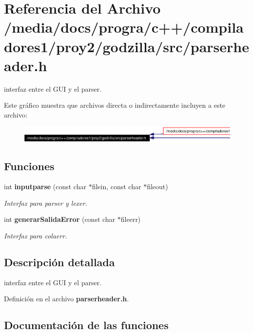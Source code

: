 \section{Referencia del Archivo /media/docs/progra/c++/compiladores1/proy2/godzilla/src/parserheader.h}
\label{parserheader_8h}
interfaz entre el GUI y el parser. 



Este gr\'{a}fico muestra que archivos directa o indirectamente incluyen a este archivo:\begin{figure}[H]
\begin{center}
\leavevmode
\includegraphics[width=420pt]{parserheader_8h__dep__incl}
\end{center}
\end{figure}
\subsection*{Funciones}
\begin{CompactItemize}
\item 
int {\bf inputparse} (const char $\ast$filein, const char $\ast$fileout)
\begin{CompactList}\small\item\em Interfaz para parser y lexer. \item\end{CompactList}\item 
int {\bf generar\-Salida\-Error} (const char $\ast$fileerr)
\begin{CompactList}\small\item\em Interfaz para colaerr. \item\end{CompactList}\end{CompactItemize}


\subsection{Descripci\'{o}n detallada}
interfaz entre el GUI y el parser. 



Definici\'{o}n en el archivo {\bf parserheader.h}.

\subsection{Documentaci\'{o}n de las funciones}
